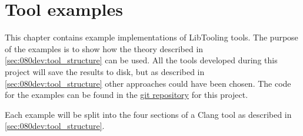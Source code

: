 \chapter{Tool examples}
This chapter contains example implementations of LibTooling tools. The purpose of the examples is to show how the theory described in \cref{sec:080dev:tool_structure} can be used. All the tools developed during this project will save the results to disk, but as described in \cref{sec:080dev:tool_structure} other approaches could have been chosen. The code for the examples can be found in the \href{https://github.com/mortenhaahr/RD/tree/main/examples}{git repository} for this project. 

Each example will be split into the four sections of a Clang tool as described in \cref{sec:080dev:tool_structure}. 

